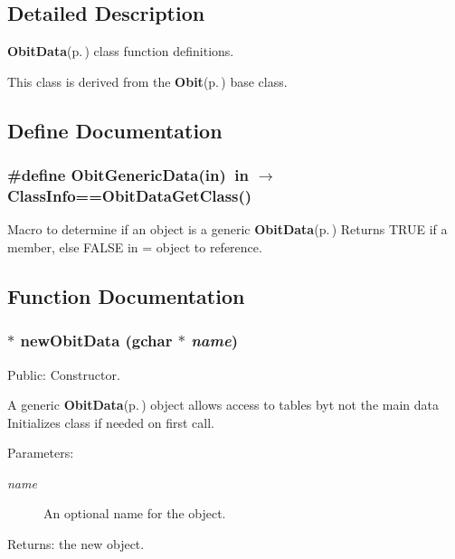 \subsection{Detailed Description}
{\bf Obit\-Data}{\rm (p.\,\pageref{structObitData})} class function definitions. 

This class is derived from the {\bf Obit}{\rm (p.\,\pageref{structObit})} base class.

\subsection{Define Documentation}
\subsubsection{\setlength{\rightskip}{0pt plus 5cm}\#define Obit\-Generic\-Data(in)\ in $\rightarrow$ Class\-Info==Obit\-Data\-Get\-Class()}\label{ObitData_8c_a0}


Macro to determine if an object is a generic {\bf Obit\-Data}{\rm (p.\,\pageref{structObitData})} Returns TRUE if a member, else FALSE in = object to reference. 



\subsection{Function Documentation}
\subsubsection{$\ast$ new\-Obit\-Data (gchar $\ast$ {\em name})}\label{ObitData_8c_a8}


Public: Constructor. 

A generic {\bf Obit\-Data}{\rm (p.\,\pageref{structObitData})} object allows access to tables byt not the main data Initializes class if needed on first call. \begin{Desc}
\item[Parameters:]
\begin{description}
\item[{\em name}]An optional name for the object. \end{description}
\end{Desc}
\begin{Desc}
\item[Returns:]the new object. \end{Desc}
